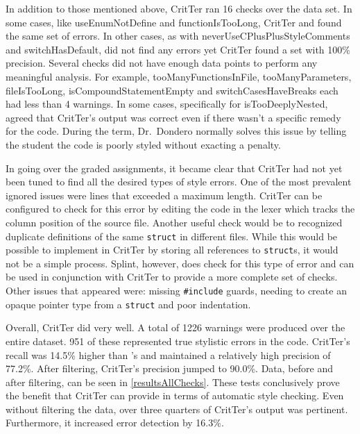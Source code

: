 \documentclass[12pt]{report}
\newcommand{\programName}{CritTer\xspace}
\begin{document}
In addition to those mentioned above, \programName ran 16 checks over the data set. In some cases, 
like useEnumNotDefine and functionIsTooLong, \programName and \human found the same set of 
errors. In other cases, as with neverUseCPlusPlusStyleComments and switchHasDefault, \human did not 
find any errors yet \programName found a set with 100\% precision. Several checks did not have enough 
data points to perform any meaningful analysis. For example, tooManyFunctionsInFile, 
tooManyParameters, fileIsTooLong, isCompoundStatementEmpty and switchCasesHaveBreaks each 
had less than 4 warnings. In some cases, specifically for isTooDeeplyNested, \human agreed that 
\programName's output was correct even if there wasn't a specific remedy for the code. During the term, 
Dr.\ Dondero normally solves this issue by telling the student the code is poorly styled without exacting a 
penalty.

In going over the graded assignments, it became clear that \programName had not yet been tuned to find 
all the desired types of style errors. One of the most prevalent ignored issues were lines that exceeded a 
maximum length. \programName can be configured to check for this error by editing the code in the lexer 
which tracks the column position of the source file. Another useful check would be to recognized 
duplicate definitions of the same \lstinline{struct} in different files. While this would be possible to 
implement in \programName by storing all references to \lstinline{struct}s, it would not be a simple 
process. Splint, however, does check for this type of error and can be used in conjunction with 
\programName to provide a more complete set of checks. Other issues that appeared were: missing 
\lstinline{#include} guards, needing to create an opaque pointer type from a \lstinline{struct} and poor 
indentation.

Overall, \programName did very well. A total of 1226 warnings were produced over the entire dataset. 
951 of these represented true stylistic errors in the code. \programName's recall was 14.5\% 
higher than \human's and maintained a relatively high precision of 77.2\%. After filtering, 
\programName's precision jumped to 90.0\%. Data, before and after filtering, can be seen in 
\autoref{resultsAllChecks}. These tests conclusively prove the benefit that \programName can provide in 
terms of automatic style checking. Even without filtering the data, over three quarters of \programName's 
output was pertinent. Furthermore, it increased error detection by 16.3\%.
\end{document}
